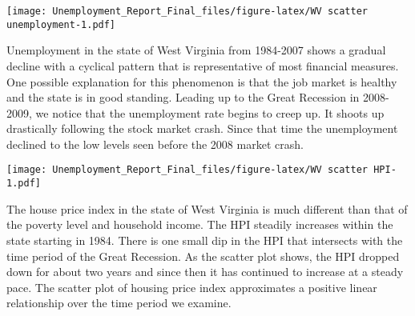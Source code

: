 \documentclass[
]{article}
\newenvironment{Shaded}{\begin{snugshade}}{\end{snugshade}}
\newcommand{\DataTypeTok}[1]{\textcolor[rgb]{0.13,0.29,0.53}{#1}}
\newcommand{\DecValTok}[1]{\textcolor[rgb]{0.00,0.00,0.81}{#1}}
\newcommand{\KeywordTok}[1]{\textcolor[rgb]{0.13,0.29,0.53}{\textbf{#1}}}
\newcommand{\NormalTok}[1]{#1}
\newcommand{\OperatorTok}[1]{\textcolor[rgb]{0.81,0.36,0.00}{\textbf{#1}}}
\newcommand{\StringTok}[1]{\textcolor[rgb]{0.31,0.60,0.02}{#1}}
\begin{document}
\texttt{[image: Unemployment\_Report\_Final\_files/figure-latex/WV scatter unemployment-1.pdf]}

Unemployment in the state of West Virginia from 1984-2007 shows a
gradual decline with a cyclical pattern that is representative of most
financial measures. One possible explanation for this phenomenon is that
the job market is healthy and the state is in good standing. Leading up
to the Great Recession in 2008-2009, we notice that the unemployment
rate begins to creep up. It shoots up drastically following the stock
market crash. Since that time the unemployment declined to the low
levels seen before the 2008 market crash.

\begin{Shaded}
\end{Shaded}

\texttt{[image: Unemployment\_Report\_Final\_files/figure-latex/WV scatter HPI-1.pdf]}

The house price index in the state of West Virginia is much different
than that of the poverty level and household income. The HPI steadily
increases within the state starting in 1984. There is one small dip in
the HPI that intersects with the time period of the Great Recession. As
the scatter plot shows, the HPI dropped down for about two years and
since then it has continued to increase at a steady pace. The scatter
plot of housing price index approximates a positive linear relationship
over the time period we examine.

\begin{Shaded}
\end{Shaded}
\end{document}
